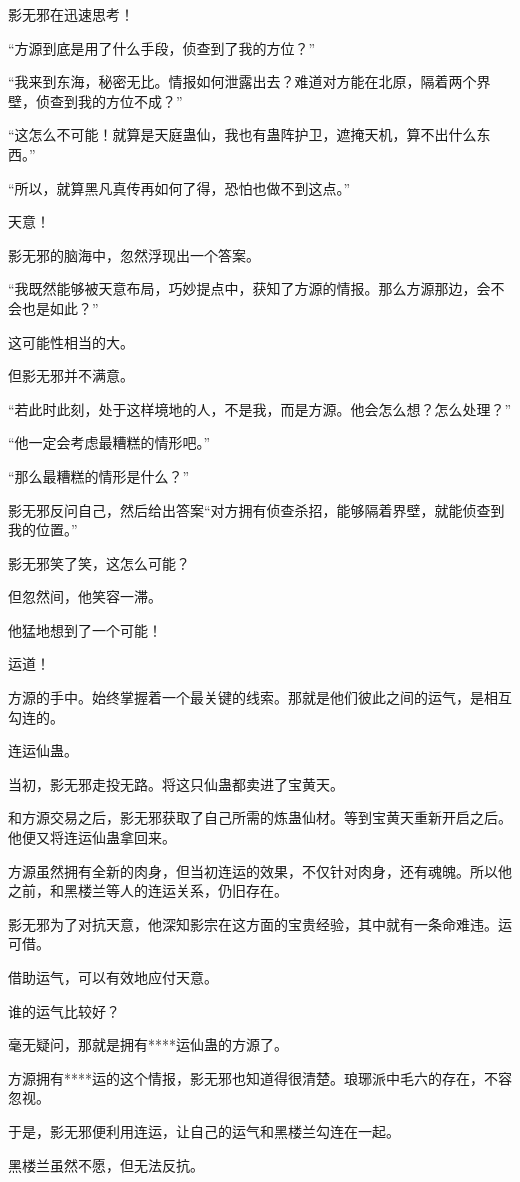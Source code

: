\begin{this_body}
影无邪在迅速思考！

“方源到底是用了什么手段，侦查到了我的方位？”

“我来到东海，秘密无比。情报如何泄露出去？难道对方能在北原，隔着两个界壁，侦查到我的方位不成？”

“这怎么不可能！就算是天庭蛊仙，我也有蛊阵护卫，遮掩天机，算不出什么东西。”

“所以，就算黑凡真传再如何了得，恐怕也做不到这点。”

天意！

影无邪的脑海中，忽然浮现出一个答案。

“我既然能够被天意布局，巧妙提点中，获知了方源的情报。那么方源那边，会不会也是如此？”

这可能性相当的大。

但影无邪并不满意。

“若此时此刻，处于这样境地的人，不是我，而是方源。他会怎么想？怎么处理？”

“他一定会考虑最糟糕的情形吧。”

“那么最糟糕的情形是什么？”

影无邪反问自己，然后给出答案“对方拥有侦查杀招，能够隔着界壁，就能侦查到我的位置。”

影无邪笑了笑，这怎么可能？

但忽然间，他笑容一滞。

他猛地想到了一个可能！

运道！

方源的手中。始终掌握着一个最关键的线索。那就是他们彼此之间的运气，是相互勾连的。

连运仙蛊。

当初，影无邪走投无路。将这只仙蛊都卖进了宝黄天。

和方源交易之后，影无邪获取了自己所需的炼蛊仙材。等到宝黄天重新开启之后。他便又将连运仙蛊拿回来。

方源虽然拥有全新的肉身，但当初连运的效果，不仅针对肉身，还有魂魄。所以他之前，和黑楼兰等人的连运关系，仍旧存在。

影无邪为了对抗天意，他深知影宗在这方面的宝贵经验，其中就有一条命难违。运可借。

借助运气，可以有效地应付天意。

谁的运气比较好？

毫无疑问，那就是拥有****运仙蛊的方源了。

方源拥有****运的这个情报，影无邪也知道得很清楚。琅琊派中毛六的存在，不容忽视。

于是，影无邪便利用连运，让自己的运气和黑楼兰勾连在一起。

黑楼兰虽然不愿，但无法反抗。


\end{this_body}
